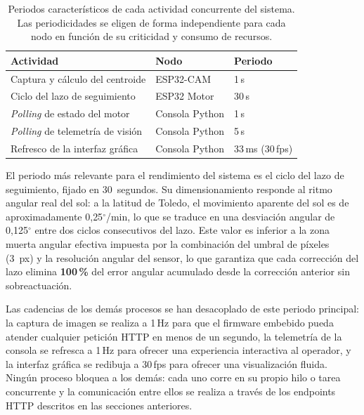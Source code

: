 \begin{table}[htbp]
    \centering
    \footnotesize
    \begin{tabular}{lll}
        \toprule
        \textbf{Actividad} & \textbf{Nodo} & \textbf{Periodo} \\
        \midrule
        Captura y cálculo del centroide   & ESP32-CAM       & 1\,s \\
        Ciclo del lazo de seguimiento     & ESP32 Motor     & 30\,s \\
        \emph{Polling} de estado del motor & Consola Python  & 1\,s \\
        \emph{Polling} de telemetría de visión & Consola Python & 5\,s \\
        Refresco de la interfaz gráfica   & Consola Python  & 33\,ms (30\,fps) \\
        \bottomrule
    \end{tabular}
    \caption{Periodos característicos de cada actividad concurrente del 
    sistema. Las periodicidades se eligen de forma independiente para 
    cada nodo en función de su criticidad y consumo de recursos.}
    \label{tab:temporizacion}
\end{table}

El periodo más relevante para el rendimiento del sistema es el ciclo del lazo de seguimiento, fijado en 30~segundos. Su dimensionamiento responde al ritmo angular real del sol: a la latitud de Toledo, el movimiento aparente del sol es de aproximadamente 0{,}25$^{\circ}$/min, lo que se traduce en una desviación angular de 0{,}125$^{\circ}$ entre dos ciclos consecutivos del lazo. Este valor es inferior a la zona muerta angular efectiva impuesta por la combinación del umbral de píxeles (3~px) y la resolución angular del sensor, lo que garantiza que cada corrección del lazo elimina \textbf{100\,\%} del error angular acumulado desde la corrección anterior sin sobreactuación.

Las cadencias de los demás procesos se han desacoplado de este 
periodo principal: la captura de imagen se realiza a 1\,Hz para que 
el firmware embebido pueda atender cualquier petición HTTP en menos 
de un segundo, la telemetría de la consola se refresca a 1\,Hz para 
ofrecer una experiencia interactiva al operador, y la interfaz 
gráfica se redibuja a 30\,fps para ofrecer una visualización fluida. 
Ningún proceso bloquea a los demás: cada uno corre en su propio hilo 
o tarea concurrente y la comunicación entre ellos se realiza a través 
de los endpoints HTTP descritos en las secciones anteriores.